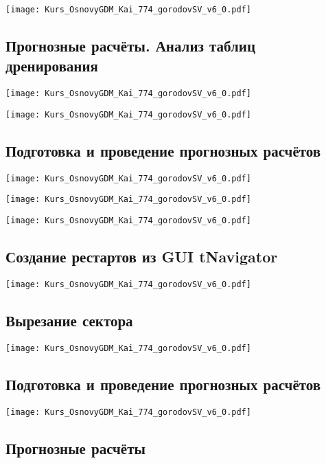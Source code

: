 \documentclass[main.tex]{subfiles}
\begin{document}
\texttt{[image: Kurs\_OsnovyGDM\_Kai\_774\_gorodovSV\_v6\_0.pdf]}

\subsection{Прогнозные расчёты. Анализ таблиц дренирования}

\texttt{[image: Kurs\_OsnovyGDM\_Kai\_774\_gorodovSV\_v6\_0.pdf]}

\texttt{[image: Kurs\_OsnovyGDM\_Kai\_774\_gorodovSV\_v6\_0.pdf]}

\subsection{Подготовка и проведение прогнозных расчётов}

\texttt{[image: Kurs\_OsnovyGDM\_Kai\_774\_gorodovSV\_v6\_0.pdf]}

\texttt{[image: Kurs\_OsnovyGDM\_Kai\_774\_gorodovSV\_v6\_0.pdf]}

\texttt{[image: Kurs\_OsnovyGDM\_Kai\_774\_gorodovSV\_v6\_0.pdf]}

\subsection{Создание рестартов из GUI tNavigator}

\texttt{[image: Kurs\_OsnovyGDM\_Kai\_774\_gorodovSV\_v6\_0.pdf]}

\subsection{Вырезание сектора}

\texttt{[image: Kurs\_OsnovyGDM\_Kai\_774\_gorodovSV\_v6\_0.pdf]}

\subsection{Подготовка и проведение прогнозных расчётов}

\texttt{[image: Kurs\_OsnovyGDM\_Kai\_774\_gorodovSV\_v6\_0.pdf]}

\subsection{Прогнозные расчёты}
\end{document}
